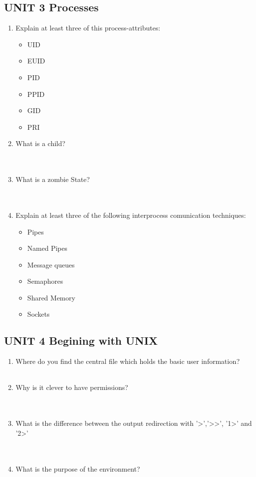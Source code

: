 \documentclass[11pt]{article}
\begin{document}
\newpage
\subsection*{UNIT 3 Processes}
\begin{enumerate}
    \item Explain at least three of this process-attributes:
    \begin{itemize}
        \item UID
        \item EUID
        \item PID
        \item PPID
        \item GID
        \item PRI
    \end{itemize}
    \item What is a child? \\
    \\
    \\
    \item What is a zombie State? \\
    \\
    \\
    \item Explain at least three of the following interprocess comunication techniques:
    \begin{itemize}
        \item Pipes
        \item Named Pipes
        \item Message queues
        \item Semaphores
        \item Shared Memory
        \item Sockets
    \end{itemize}
\end{enumerate}

\newpage
\subsection*{UNIT 4 Begining with UNIX}
\begin{enumerate}
    \item Where do you find the central file which holds the basic user information? \\
    \\
    \item Why is it clever to have permissions? \\
    \\
    \\
    \item What is the difference between the output redirection with '\textgreater','\textgreater\textgreater', '1\textgreater' and '2\textgreater' \\
    \\
    \\
    \item What is the purpose of the environment? \\
    \\
    \\
    \\
\end{enumerate}
\end{document}
